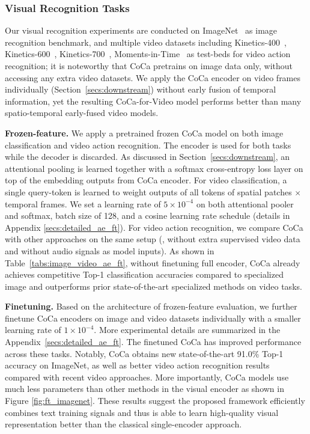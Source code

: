 \subsubsection{Visual Recognition Tasks}
\label{secs:visual_recognition}
Our visual recognition experiments are conducted on ImageNet~\cite{deng2009imagenet} as image recognition benchmark, and multiple video datasets including Kinetics-400~\cite{kay2017kinetics}, Kinetics-600~\cite{carreira2018short}, Kinetics-700~\cite{carreira2019short}, Moments-in-Time~\cite{monfort2019moments} as test-beds for video action recognition; it is noteworthy that CoCa pretrains on image data only, without accessing any extra video datasets. We apply the CoCa encoder on video frames individually (Section~\ref{secs:downstream}) without early fusion of temporal information, yet the resulting CoCa-for-Video model performs better than many spatio-temporal early-fused video models. 

\textbf{Frozen-feature.} We apply a pretrained frozen CoCa model on both image classification and video action recognition. The encoder is used for both tasks while the decoder is discarded. As discussed in Section~\ref{secs:downstream}, an attentional pooling is learned together with a softmax cross-entropy loss layer on top of the embedding outputs from CoCa encoder. For video classification, a single query-token is learned to weight outputs of all tokens of spatial patches \(\times\) temporal frames. We set a learning rate of \(5\times10^{-4}\) on both attentional pooler and softmax, batch size of 128, and a cosine learning rate schedule (details in Appendix \ref{secs:detailed_ae_ft}). For video action recognition, we compare CoCa with other approaches on the same setup (\ie, without extra supervised video data and without audio signals as model inputs).
As shown in Table~\ref{tabs:image_video_ae_ft}, without finetuning full encoder,
CoCa already achieves competitive Top-1 classification accuracies compared to specialized image and outperforms prior state-of-the-art specialized methods on video tasks.


\textbf{Finetuning.} Based on the architecture of frozen-feature evaluation, we further finetune CoCa encoders on image and video datasets individually with a smaller learning rate of \(1\times10^{-4}\). More experimental details are summarized in the Appendix~\ref{secs:detailed_ae_ft}.
The finetuned CoCa has improved performance across these tasks.
Notably, CoCa obtains new state-of-the-art 91.0\% Top-1 accuracy on ImageNet, as well as better video action recognition results compared with recent video approaches.
More importantly, CoCa models use much less parameters than other methods in the visual encoder as shown in Figure \ref{fig:ft_imagenet}.
These results suggest the proposed framework efficiently combines text training signals and thus is able to learn high-quality visual representation better than the classical single-encoder approach.


